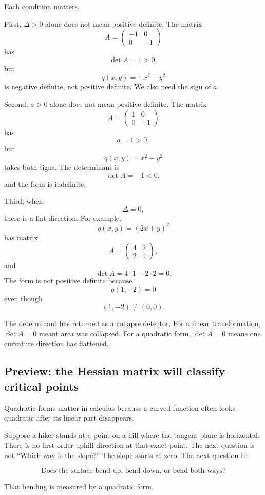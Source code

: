 Each condition matters.

First, \(\Delta>0\) alone does not mean positive definite.  The matrix
\[
    A=
    \begin{pmatrix}
        -1&0\\
        0&-1
    \end{pmatrix}
\]
has
\[
    \det A=1>0,
\]
but
\[
    q(x,y)=-x^2-y^2
\]
is negative definite, not positive definite.  We also need the sign of \(a\).

Second, \(a>0\) alone does not mean positive definite.  The matrix
\[
    A=
    \begin{pmatrix}
        1&0\\
        0&-1
    \end{pmatrix}
\]
has
\[
    a=1>0,
\]
but
\[
    q(x,y)=x^2-y^2
\]
takes both signs.  The determinant is
\[
    \det A=-1<0,
\]
and the form is indefinite.

Third, when
\[
    \Delta=0,
\]
there is a flat direction.  For example,
\[
    q(x,y)=(2x+y)^2
\]
has matrix
\[
    A=
    \begin{pmatrix}
        4&2\\
        2&1
    \end{pmatrix},
\]
and
\[
    \det A=4\cdot1-2\cdot2=0.
\]
The form is not positive definite because
\[
    q(1,-2)=0
\]
even though
\[
    (1,-2)\neq(0,0).
\]

The determinant has returned as a collapse detector.  For a linear transformation,
\(\det A=0\) meant area was collapsed.  For a quadratic form, \(\det A=0\) means one
curvature direction has flattened.

\subsection{Preview: the Hessian matrix will classify critical points}

Quadratic forms matter in calculus because a curved function often looks quadratic
after its linear part disappears.

Suppose a hiker stands at a point on a hill where the tangent plane is horizontal.
There is no first-order uphill direction at that exact point.  The next question is not
``Which way is the slope?''  The slope starts at zero.  The next question is:

\[
    \text{Does the surface bend up, bend down, or bend both ways?}
\]

That bending is measured by a quadratic form.

